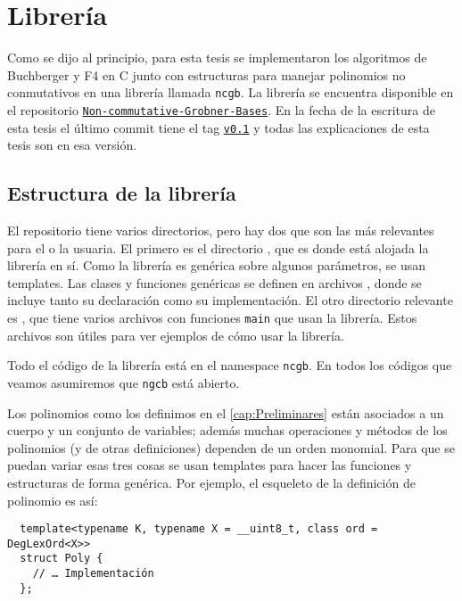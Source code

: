 \documentclass[12pt]{report}
\theoremstyle{customstyle}
\theoremstyle{factstyle}
\newcommand\cpp{C\nolinebreak[4]\hspace{-.05em}\raisebox{.4ex}{\relsize{-3}{\textbf{++}}}\xspace}
\begin{document}
\chapter{Librería}\label{cap:Librería}

Como se dijo al principio, para esta tesis se implementaron los algoritmos de Buchberger y F4 en \cpp junto con estructuras para manejar polinomios no conmutativos en una librería llamada \texttt{ncgb}. La librería se encuentra disponible en el repositorio \href{https://github.com/IvanRenison/Non-commutative-Grobner-Bases}{\texttt{Non-commutative-Grobner-Bases}}. En la fecha de la escritura de esta tesis  el último commit tiene el tag \href{https://github.com/IvanRenison/Non-commutative-Grobner-Bases/tree/v0.1}{\texttt{v0.1}} y todas las explicaciones de esta tesis son en esa versión.

\section{Estructura de la librería}

El repositorio tiene varios directorios, pero hay dos que son las más relevantes para el o la usuaria. El primero es el directorio , que es donde está alojada la librería en sí. Como la librería es genérica sobre algunos parámetros, se usan templates. Las clases y funciones genéricas se definen en archivos , donde se incluye tanto su declaración como su implementación. El otro directorio relevante es , que tiene varios archivos  con funciones \texttt{main} que usan la librería. Estos archivos son útiles para ver ejemplos de cómo usar la librería.

Todo el código de la librería está en el namespace \texttt{ncgb}. En todos los códigos que veamos asumiremos que \texttt{ngcb} está abierto.

Los polinomios como los definimos en el \cref{cap:Preliminares} están asociados a un cuerpo y un conjunto de variables; además muchas operaciones y métodos de los polinomios (y de otras definiciones) dependen de un orden monomial. Para que se puedan variar esas tres cosas se usan templates para hacer las funciones y estructuras de forma genérica. Por ejemplo, el esqueleto de la definición de polinomio es así: %

\begin{verbatim}
  template<typename K, typename X = __uint8_t, class ord = DegLexOrd<X>>
  struct Poly {
    // … Implementación
  };
\end{verbatim}
\end{document}
